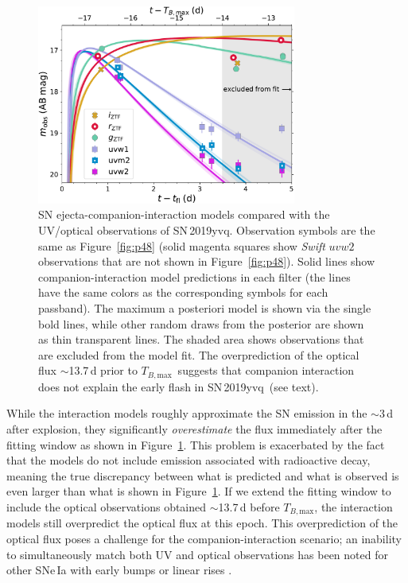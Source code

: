 \documentclass[twocolumn]{aastex63}
\newcommand{\tbmax}{$T_{B,\mathrm{max}}$}
\newcommand{\sn}{SN\,2019yvq}
\begin{document}
\begin{figure}
    \centering
    \includegraphics[width=3.35in]{./figures/sn_companion_models.pdf}
    \caption{SN ejecta-companion-interaction models compared with the
    UV/optical observations of \sn. Observation symbols are the same as
    Figure~\ref{fig:p48} (solid magenta squares show \textit{Swift} $uvw2$
    observations that are not shown in Figure~\ref{fig:p48}). Solid lines show
    companion-interaction model predictions in each filter (the lines have the
    same colors as the corresponding symbols for each passband). The maximum a
    posteriori model is shown via the single bold lines, while other random
    draws from the posterior are shown as thin transparent lines. The shaded
    area shows observations that are excluded from the model fit. The
    overprediction of the optical flux $\sim$13.7\,d prior to \tbmax\ suggests
    that companion interaction does not explain the early flash in \sn\ (see
    text).}
    \label{fig:companion}
\end{figure}

While the interaction models roughly approximate the SN emission in the
$\sim$3\,d after explosion, they significantly \textit{overestimate} the flux
immediately after the fitting window as shown in Figure~\ref{fig:companion}.
This problem is exacerbated by the fact that the models do not include
emission associated with radioactive decay, meaning the true discrepancy
between what is predicted and what is observed is even larger than what is
shown in Figure~\ref{fig:companion}. If we extend the fitting window to
include the optical observations obtained $\sim$13.7\,d before \tbmax, the
interaction models still overpredict the optical flux at this epoch. This
overprediction of the optical flux poses a challenge for the
companion-interaction scenario; an inability to simultaneously match both UV
and optical observations has been noted for other SNe\,Ia with early bumps or
linear rises \citep{Hosseinzadeh17,Miller18}.
\end{document}
